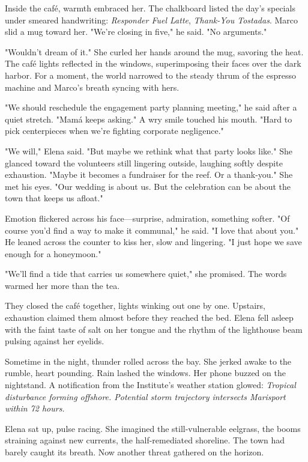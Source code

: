 Inside the café, warmth embraced her. The chalkboard listed the day's specials under smeared handwriting: \textit{Responder Fuel Latte}, \textit{Thank-You Tostadas}. Marco slid a mug toward her. "We're closing in five," he said. "No arguments."

"Wouldn't dream of it." She curled her hands around the mug, savoring the heat. The café lights reflected in the windows, superimposing their faces over the dark harbor. For a moment, the world narrowed to the steady thrum of the espresso machine and Marco's breath syncing with hers.

"We should reschedule the engagement party planning meeting," he said after a quiet stretch. "Mamá keeps asking." A wry smile touched his mouth. "Hard to pick centerpieces when we're fighting corporate negligence."

"We will," Elena said. "But maybe we rethink what that party looks like." She glanced toward the volunteers still lingering outside, laughing softly despite exhaustion. "Maybe it becomes a fundraiser for the reef. Or a thank-you." She met his eyes. "Our wedding is about us. But the celebration can be about the town that keeps us afloat."

Emotion flickered across his face—surprise, admiration, something softer. "Of course you'd find a way to make it communal," he said. "I love that about you." He leaned across the counter to kiss her, slow and lingering. "I just hope we save enough for a honeymoon."

"We'll find a tide that carries us somewhere quiet," she promised. The words warmed her more than the tea.

They closed the café together, lights winking out one by one. Upstairs, exhaustion claimed them almost before they reached the bed. Elena fell asleep with the faint taste of salt on her tongue and the rhythm of the lighthouse beam pulsing against her eyelids.

Sometime in the night, thunder rolled across the bay. She jerked awake to the rumble, heart pounding. Rain lashed the windows. Her phone buzzed on the nightstand. A notification from the Institute's weather station glowed: \textit{Tropical disturbance forming offshore. Potential storm trajectory intersects Marisport within 72 hours.}

Elena sat up, pulse racing. She imagined the still-vulnerable eelgrass, the booms straining against new currents, the half-remediated shoreline. The town had barely caught its breath. Now another threat gathered on the horizon.

